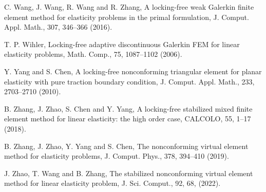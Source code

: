 \documentclass[11pt]{article}
\numberwithin{equation}{section}
\begin{document}
\begin{thebibliography}{99.}
 C. Wang, J. Wang, R. Wang and  R. Zhang, A locking-free weak Galerkin finite element method for elasticity problems in the primal formulation, J. Comput. Appl. Math., 307, 346--366 (2016).

 T. P. Wihler, Locking-free adaptive discontinuous Galerkin FEM for linear elasticity problems, Math. Comp.,  75, 1087--1102 (2006).

 Y. Yang and  S. Chen, A locking-free nonconforming triangular element for planar elasticity with pure traction boundary condition, J. Comput. Appl. Math., 233, 2703--2710 (2010).


 B. Zhang, J. Zhao, S. Chen and  Y. Yang, A locking-free stabilized mixed finite element method for linear elasticity: the high order case, CALCOLO, 55, 1--17 (2018).

 B. Zhang, J. Zhao, Y. Yang and  S. Chen, The nonconforming virtual element method for elasticity problems, J. Comput. Phys., 378, 394--410 (2019).

 J. Zhao, T. Wang and  B. Zhang, The stabilized nonconforming virtual element method for linear elasticity problem, J. Sci. Comput., 92, 68, (2022).

\end{thebibliography}
\end{document}
